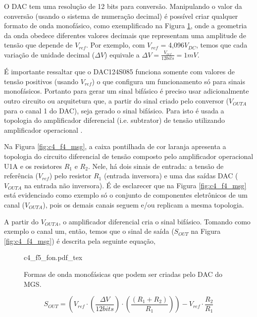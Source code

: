 O \acrshort{DAC} tem uma resolução de 12 bits para conversão. Manipulando o valor da conversão (usando o sistema de numeração decimal) é possível criar qualquer formato de onda monofásico, como exemplificado na Figura \ref{fig:c4_f5_fon}, onde a geometria da onda obedece diferentes valores decimais que representam uma amplitude de tensão que depende de $V_{ref}$. Por exemplo, com $V_{ref}$ = 4,096$V_{DC}$, temos que cada variação de unidade decimal ($\Delta V$) equivale a $\Delta V= \frac{V_{ref}}{12bits}=1mV$.

É importante ressaltar que o DAC124S085 funciona somente com valores de tensão positivos (usando $V_{ref}$) o que configura um funcionamento só para sinais monofásicos. Portanto para gerar um sinal bifásico é preciso usar adicionalmente outro circuito ou arquitetura que, a partir do sinal criado pelo conversor ($V_{OUTA}$ para o canal 1 do \acrshort{DAC}), seja gerado o sinal bifásico. Para isto é usada a topologia do amplificador diferencial (i.e. subtrator) de tensão utilizando amplificador operacional \cite{Jung2005, Carter2001}. 

Na Figura \ref{fig:c4_f4_msg}, a caixa pontilhada de cor laranja apresenta a topologia do circuito diferencial de tensão composto pelo amplificador operacional U1A e os resistores $R_1$ e $R_2$. Nele, há dois sinais de entrada: a tensão de referência ($V_{ref}$) pelo resistor $R_1$ (entrada inversora) e uma das saídas \acrshort{DAC} ($V_{OUTA}$ na entrada não inversora). É de esclarecer que na Figura \ref{fig:c4_f4_msg} está evidenciado como exemplo só o conjunto de componentes eletrônicos de um canal ($V_{OUTA}$), pois os demais canais seguem e/ou replicam a mesma topologia. 

A partir do $V_{OUTA}$, o amplificador diferencial cria o sinal bifásico. Tomando como exemplo o canal um, então, temos que o sinal de saída ($S_{OUT}$ na Figura \ref{fig:c4_f4_msg}) é descrita pela seguinte equação,

\begin{figure}[h]
    \centering %
    \small %
    \def\svgwidth{1\columnwidth}%
    {c4_f5_fon.pdf_tex}
    \caption{Formas de onda monofásicas que podem ser criadas pelo \acrshort{DAC} do \acrshort{MGS}.}
    \label{fig:c4_f5_fon}
\end{figure}

\begin{equation}
    S_{OUT} =\left(V_{ref} \cdot \left(\frac{\Delta V}{12bits}\right)\cdot\left(\frac{(R_1 + R_2)}{R_1}\right)\right)- V_{ref}\cdot\frac{R_2}{R_1}
    \label{eq:c4_1}
\end{equation}


